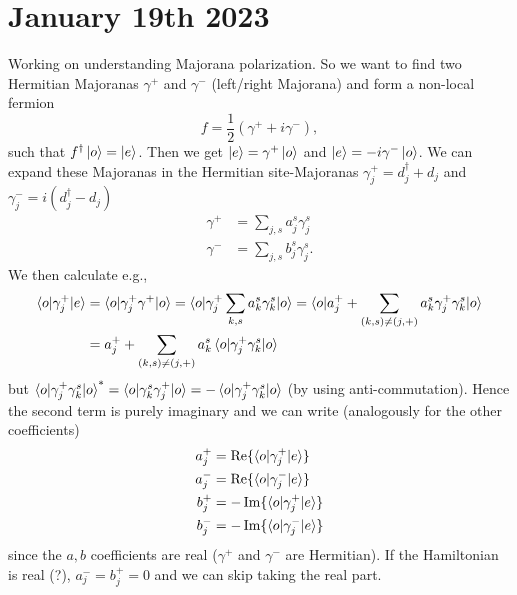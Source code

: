 \documentclass{article}
\begin{document}
\section*{January 19th 2023}
Working on understanding Majorana polarization. So we want to find two Hermitian Majoranas $\gamma^+$ and $\gamma^-$ (left/right Majorana) and form a non-local fermion
\begin{equation}
   f = \frac{1}{2}(\gamma^+ + i\gamma^-), 
\end{equation}
such that $f^\dag\ket{o} = \ket{e}$. Then we get $\ket{e} = \gamma^+\ket{o}$ and $\ket{e} = -i\gamma^-\ket{o}$. We can expand these Majoranas in the Hermitian site-Majoranas $\gamma_j^+ = d^\dag_j + d_j$ and $\gamma^-_j = i(d^\dag_j - d_j)$
\begin{equation}
\begin{split}
    \gamma^+ &= \sum_{j,s} a_j^s \gamma_j^s \\
    \gamma^- &= \sum_{j,s} b_j^s \gamma_j^s. 
\end{split}
\end{equation}
We then calculate e.g.,
\begin{equation}
    \begin{split}
        \braket{o|\gamma_j^+|e} &= \braket{o|\gamma_j^+ \gamma^+|o} = \braket{o|\gamma_j^+ \sum_{k,s} a_k^s \gamma_k^s|o} = \braket{o|a_j^+ + \sum_{(k, s)\neq(j,+)}a_k^s\gamma_j^+\gamma_k^s|o} \\
                                &= a_j^+ + \sum_{(k, s)\neq(j,+)} a_k^s \braket{o|\gamma_j^+\gamma_k^s|o}
    \end{split}
\end{equation}
but $\braket{o|\gamma_j^+\gamma_k^s|o}^*=\braket{o|\gamma_k^s\gamma_j^+|o} = -\braket{o|\gamma_j^+\gamma_k^s|o}$ (by using anti-commutation). Hence the second term is purely imaginary and we can write (analogously for the other coefficients)
\begin{equation}
    \begin{split}
        a_j^+ &= \operatorname{Re}\{\braket{o|\gamma_j^+|e}\} \\
        a_j^- &= \operatorname{Re}\{\braket{o|\gamma_j^-|e}\} \\
        b_j^+ &= -\operatorname{Im}\{\braket{o|\gamma_j^+|e}\} \\
        b_j^- &= -\operatorname{Im}\{\braket{o|\gamma_j^-|e}\} \\
    \end{split}
\end{equation}
since the $a,b$ coefficients are real ($\gamma^+$ and $\gamma^-$ are Hermitian). If the Hamiltonian is real (?), $a_j^- = b_j^+ = 0$ and we can skip taking the real part.
\end{document}
